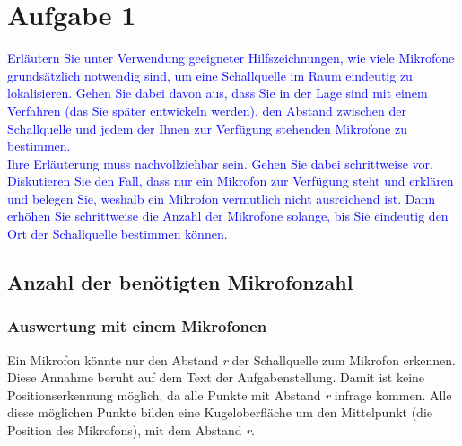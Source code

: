 
\newpage
\newpage
\newpage
\pagebreak
\vspace{30cm}
\section{Aufgabe 1}
\textcolor{blue}{Erläutern Sie unter Verwendung geeigneter Hilfszeichnungen, wie viele Mikrofone grundsätzlich notwendig sind, um eine Schallquelle im Raum eindeutig zu lokalisieren. Gehen Sie dabei davon aus, dass Sie in der Lage sind mit einem Verfahren (das Sie später entwickeln werden), den Abstand zwischen der Schallquelle und jedem der Ihnen zur Verfügung stehenden Mikrofone zu bestimmen.\\ Ihre Erläuterung muss nachvollziehbar sein. Gehen Sie dabei schrittweise vor. Diskutieren Sie den Fall, dass nur ein Mikrofon zur Verfügung steht und erklären und belegen Sie, weshalb ein Mikrofon vermutlich nicht ausreichend ist. Dann erhöhen Sie schrittweise die Anzahl der Mikrofone solange, bis Sie eindeutig den Ort der Schallquelle bestimmen können. } 
\subsection{Anzahl der benötigten Mikrofonzahl}
\subsubsection{Auswertung mit einem Mikrofonen}
Ein Mikrofon könnte nur den Abstand \textit{r} der Schallquelle zum Mikrofon erkennen. Diese Annahme beruht auf dem Text der Aufgabenstellung. Damit ist keine Positionserkennung möglich, da alle Punkte mit Abstand \textit{r} infrage kommen. 
Alle diese möglichen Punkte bilden eine Kugeloberfläche um den Mittelpunkt (die Position des Mikrofons), mit dem Abstand \textit{r}.

